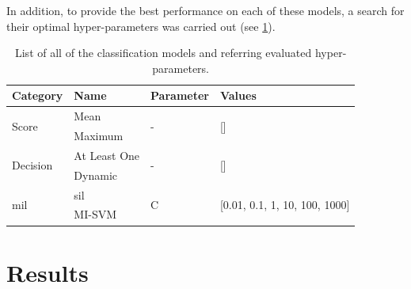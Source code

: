 \documentclass[journal,article,submit,moreauthors,pdftex, applsci]{Definitions/mdpi}
\begin{document}
In addition, to provide the best performance on each of these models, a search for their optimal hyper-parameters was carried out (see \cref{tab:patient_hyperparameters}).\par
\begin{table}[]
    \centering
    \begin{tabular}{llll}
    \textbf{Category}               & \textbf{Name}     & \textbf{Parameter}& \textbf{Values}                                   \\ \hline
    \multirow{2}{*}{Score}          & Mean              & \multirow{2}{*}{-}& \multirow{2}{*}{[]}                               \\ \cline{2-2}
                                    & Maximum           &                   &                                                   \\ \hline 
    \multirow{2}{*}{Decision}       & At Least One      & \multirow{2}{*}{-}& \multirow{2}{*}{[]}                               \\ \cline{2-2}
                                    & Dynamic           &                   &                                                   \\ \hline 
    \multirow{2}{*}{\ac{mil}}       & \ac{sil}          & \multirow{2}{*}{C}& \multirow{2}{*}{[0.01, 0.1, 1, 10, 100, 1000]}    \\ \cline{2-2}
                                    & MI-SVM            &                   &                                                   \\ \hline 
    \end{tabular}    
    \caption{List of all of the classification models and referring evaluated hyper-parameters.}
    \label{tab:patient_hyperparameters}
\end{table}
\par


\section{Results}
\label{sec:results}
\end{document}
